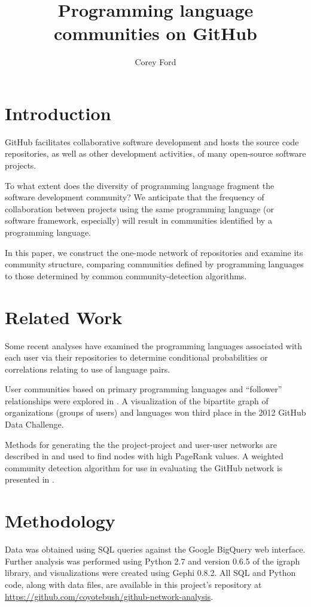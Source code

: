 \documentclass[twocolumn]{article}
\title{Programming language communities on GitHub}
\author{Corey Ford}
\begin{document}
\maketitle

\section{Introduction}

GitHub \cite{github} facilitates collaborative software development and hosts
the source code repositories, as well as other development activities, of many
open-source software projects.

To what extent does the diversity of programming language fragment the software
development community? We anticipate that the frequency of collaboration between
projects using the same programming language (or software framework, especially)
will result in communities identified by a programming language.

In this paper, we construct the one-mode network of repositories and examine its
community structure, comparing communities defined by programming languages to
those determined by common community-detection algorithms.

\section{Related Work}
Some recent analyses have examined the programming languages associated with
each user via their repositories to determine conditional probabilities
\cite{doll12} or correlations \cite{shah13} relating to use of language pairs.

User communities based on primary programming languages and ``follower''
relationships were explored in \cite{cuny10,weber12}.  A visualization of the
bipartite graph of organizations (groups of users) and languages
\cite{rodrigues12} won third place in the 2012 GitHub Data Challenge.

Methods for generating the the project-project and user-user networks are
described in \cite{thung2013} and used to find nodes with high PageRank values.
A weighted community detection algorithm for use in evaluating the GitHub
network is presented in \cite{marrama}.

\section{Methodology}
Data was obtained using SQL queries against the Google BigQuery web interface.
Further analysis was performed using Python 2.7 and version 0.6.5 of the igraph
library, and visualizations were created using Gephi 0.8.2. All SQL and Python
code, along with data files, are available in this project's repository at
\url{https://github.com/coyotebush/github-network-analysis}.
\end{document}
